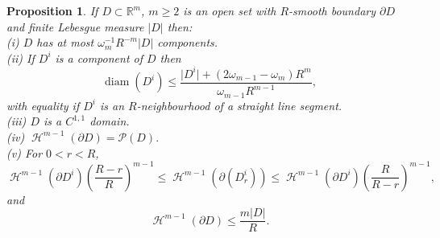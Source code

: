 \documentclass[a4paper,9pt]{amsart}
\newtheorem{proposition}[theorem]{Proposition}
\begin{document}
\begin{proposition}\label{L:prop1}
If $D \subset \mathbb{R}^{m}$, $m\geq 2$ is an open set with
$R$-smooth boundary $\partial D$ and finite Lebesgue measure
$\vert D \vert$ then:\\
\noindent \textup{(i)} $D$ has at most $\omega_m^{-1}R^{-m}|D|$
components.\\
\noindent \textup{(ii)} If $D^{i}$ is a component of $D$ then
\begin{equation}\label{e11}
\operatorname{diam} (D^{i}) \leq
\frac{\vert D^{i} \vert + (2\omega_{m-1}-\omega_{m})R^{m}}{\omega_{m-1}R^{m-1}},
\end{equation}
with equality if $D^{i}$ is an $R$-neighbourhood of a straight line segment.\\
\noindent \textup{(iii)} $D$ is a $C^{1,1}$ domain.\\
\noindent \textup{(iv)} $\operatorname{\mathcal{H}}^{m-1}(\partial D)=\mathcal{P}(D).$ \\
\noindent \textup{(v)} For $0 < r < R$,
\begin{equation}
\operatorname{\mathcal{H}}^{m-1}(\partial D^{i})\left(\frac{R-r}{R}\right)^{m-1} \leq
\operatorname{\mathcal{H}}^{m-1}(\partial (D^{i}_{r})) \leq \operatorname{\mathcal{H}}^{m-1}(\partial
D^{i})\left(\frac{R}{R-r}\right)^{m-1}, \label{e18}
\end{equation}
and
\begin{equation}\label{e19b}
\operatorname{\mathcal{H}}^{m-1}(\partial D)\le \frac{m|D|}{R}.
\end{equation}
\end{proposition}
\end{document}

